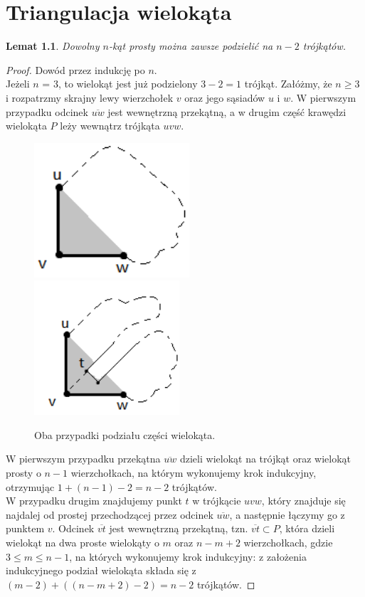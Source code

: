 \documentclass[brudnopis]{xmgr}
\newtheorem{Lemat}{Lemat}
\theoremstyle{definition}
\begin{document}
\chapter{Triangulacja wielokąta}\label{triangulacja}
\begin{Lemat}\label{podzial na trojkaty}
Dowolny $n$-kąt prosty można zawsze podzielić na $n-2$ trójkątów.
\end{Lemat}
\begin{proof}
	Dowód przez indukcję po $n$.
	\\Jeżeli $n$ = 3, to wielokąt jest już podzielony $3 - 2 = 1$ trójkąt.
	Załóżmy, że $n \ge 3$ i rozpatrzmy skrajny lewy wierzchołek $v$ oraz jego sąsiadów $u$ i $w$.
	W pierwszym przypadku odcinek $\overline{uw}$ jest wewnętrzną przekątną, a w drugim część krawędzi wielokąta $P$ leży wewnątrz trójkąta $uvw$.

  \begin{figure}[ht!]
    \centering
    \includegraphics[height=5cm]{rysunki/triangulacja_1.png}
    \includegraphics[height=5cm]{rysunki/triangulacja_2.png}
    \caption{Oba przypadki podziału części wielokąta.}
  \end{figure} 
	
	\indent W pierwszym przypadku przekątna $\overline{u w}$ dzieli wielokąt na trójkąt oraz wielokąt prosty o $n - 1$ wierzchołkach, na którym wykonujemy krok indukcyjny, otrzymując $1 + (n - 1) -2 = n - 2$ trójkątów.
	\\\indent W przypadku drugim znajdujemy punkt $t$ w trójkącie $uvw$, który znajduje się najdalej od prostej przechodzącej przez odcinek $\overline{uw}$, a następnie łączymy go z punktem $v$. Odcinek $\overline{v t}$ jest wewnętrzną przekątną, tzn. $\overline{vt} \subset P$, która dzieli wielokąt na dwa proste wielokąty o $m$ oraz $n - m + 2$ wierzchołkach, gdzie $3 \le m \le n-1$, na których wykonujemy krok indukcyjny: z założenia indukcyjnego podział wielokąta składa się z $(m - 2) + ((n - m + 2) -2) = n - 2$ trójkątów.
\end{proof}
\end{document}
